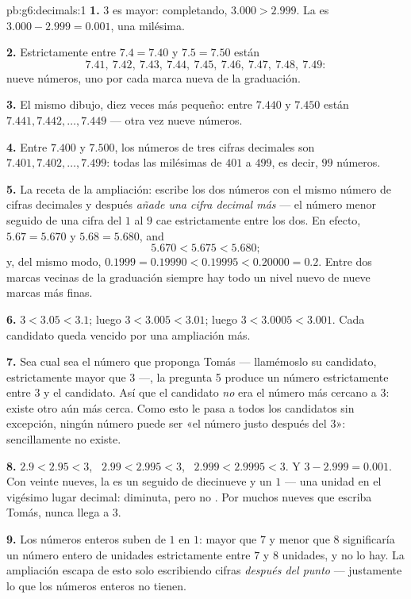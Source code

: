 \begin{solution}{pb:g6:decimals:1}
\textbf{1.} $3$ es mayor: completando, $3.000 > 2.999$. La
 es $3.000 - 2.999 = 0.001$, una milésima.

\textbf{2.} Estrictamente entre $7.4 = 7.40$ y $7.5 = 7.50$ están
\[
7.41,\ 7.42,\ 7.43,\ 7.44,\ 7.45,\ 7.46,\ 7.47,\ 7.48,\ 7.49 :
\]
nueve números, uno por cada marca nueva de la graduación.

\textbf{3.} El mismo dibujo, diez veces más pequeño: entre $7.440$
y $7.450$ están $7.441, 7.442, \dots, 7.449$ --- otra vez nueve
números.

\textbf{4.} Entre $7.400$ y $7.500$, los números de tres
cifras decimales son $7.401, 7.402, \dots, 7.499$: todas las
milésimas de $401$ a $499$, es decir, $99$ números.

\textbf{5.} La receta de la ampliación: escribe los dos números con el mismo
número de cifras decimales y después \emph{añade una cifra decimal más}
--- el número menor seguido de una cifra del $1$ al $9$ cae
estrictamente entre los dos. En efecto, $5.67 = 5.670$ y
$5.68 = 5.680$, and
\[
5.670 < 5.675 < 5.680 ;
\]
y, del mismo modo, $0.1999 = 0.19990 < 0.19995 < 0.20000 = 0.2$. Entre
dos marcas vecinas de la graduación siempre hay todo un nivel nuevo de
nueve marcas más finas.

\textbf{6.} $3 < 3.05 < 3.1$; luego $3 < 3.005 < 3.01$; luego
$3 < 3.0005 < 3.001$. Cada candidato queda vencido por una ampliación más.

\textbf{7.} Sea cual sea el número que proponga Tomás --- llamémoslo su
candidato, estrictamente mayor que $3$ ---, la pregunta 5 produce un
número estrictamente entre $3$ y el candidato. Así que el candidato
\emph{no} era el número más cercano a $3$: existe otro aún más cerca.
Como esto le pasa a todos los candidatos sin excepción,
ningún número puede ser «el número justo después del $3$»: sencillamente
no existe.

\textbf{8.} $2.9 < 2.95 < 3$, \ $2.99 < 2.995 < 3$, \
$2.999 < 2.9995 < 3$. Y $3 - 2.999 = 0.001$. Con veinte
nueves, la  es un  seguido de diecinueve
\omterm{def:g1:counting:zero}{ceros} y un $1$ --- una unidad en el vigésimo lugar decimal:
diminuta, pero no \omterm{def:g1:counting:zero}{cero}. Por muchos nueves que escriba Tomás, nunca
llega a $3$.

\textbf{9.} Los números enteros suben de $1$ en $1$: mayor que $7$
y menor que $8$ significaría un número entero de unidades estrictamente
entre $7$ y $8$ unidades, y no lo hay. La ampliación escapa de
esto solo escribiendo cifras \emph{después del punto} --- justamente
lo que los números enteros no tienen.


\end{solution}

